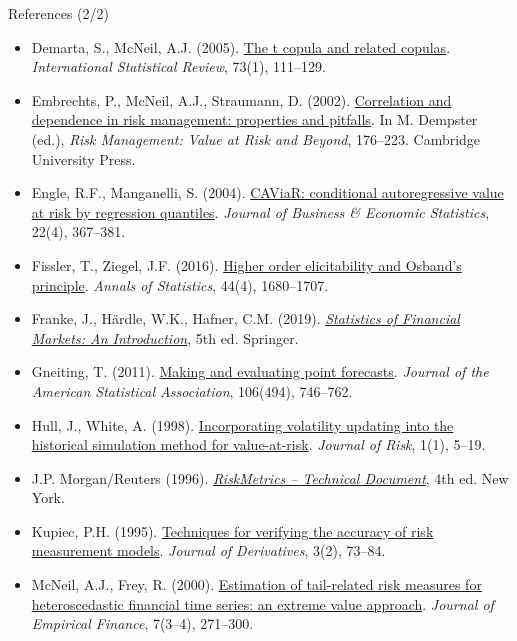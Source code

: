 \begin{frame}{References (2/2)}
\itemsize{\tiny}
\begin{itemize}
    \item Demarta, S., McNeil, A.J. (2005). \href{https://doi.org/10.1111/j.1751-5823.2005.tb00254.x}{The t copula and related copulas}. \textit{International Statistical Review}, 73(1), 111--129.
    \item Embrechts, P., McNeil, A.J., Straumann, D. (2002). \href{https://doi.org/10.1017/CBO9780511615337.008}{Correlation and dependence in risk management: properties and pitfalls}. In M. Dempster (ed.), \textit{Risk Management: Value at Risk and Beyond}, 176--223. Cambridge University Press.
    \item Engle, R.F., Manganelli, S. (2004). \href{https://doi.org/10.1198/073500104000000370}{CAViaR: conditional autoregressive value at risk by regression quantiles}. \textit{Journal of Business \& Economic Statistics}, 22(4), 367--381.
    \item Fissler, T., Ziegel, J.F. (2016). \href{https://doi.org/10.1214/16-AOS1439}{Higher order elicitability and Osband's principle}. \textit{Annals of Statistics}, 44(4), 1680--1707.
    \item Franke, J., Härdle, W.K., Hafner, C.M. (2019). \href{https://doi.org/10.1007/978-3-030-13751-9}{\textit{Statistics of Financial Markets: An Introduction}}, 5th ed. Springer.
    \item Gneiting, T. (2011). \href{https://doi.org/10.1198/jasa.2011.r10138}{Making and evaluating point forecasts}. \textit{Journal of the American Statistical Association}, 106(494), 746--762.
    \item Hull, J., White, A. (1998). \href{https://doi.org/10.21314/JOR.1998.001}{Incorporating volatility updating into the historical simulation method for value-at-risk}. \textit{Journal of Risk}, 1(1), 5--19.
    \item J.P. Morgan/Reuters (1996). \href{https://www.msci.com/documents/10199/5915b101-4206-4ba0-aee2-3449d5c7e95a}{\textit{RiskMetrics -- Technical Document}}, 4th ed. New York.
    \item Kupiec, P.H. (1995). \href{https://doi.org/10.3905/jod.1995.407942}{Techniques for verifying the accuracy of risk measurement models}. \textit{Journal of Derivatives}, 3(2), 73--84.
    \item McNeil, A.J., Frey, R. (2000). \href{https://doi.org/10.1016/S0927-5398(00)00012-8}{Estimation of tail-related risk measures for heteroscedastic financial time series: an extreme value approach}. \textit{Journal of Empirical Finance}, 7(3--4), 271--300.

\end{itemize}
\end{frame}
